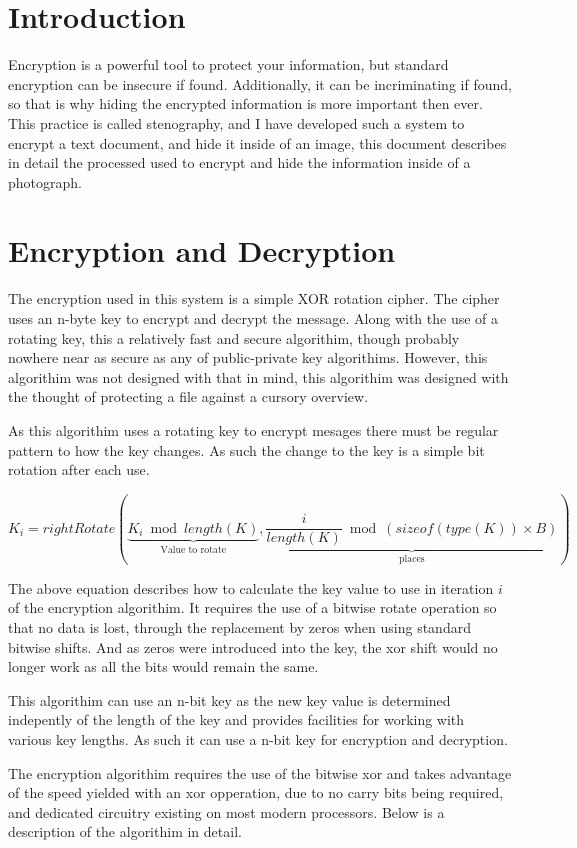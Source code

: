 \documentclass[12pt,draft]{article}
\begin{document}
\section{Introduction}
  Encryption is a powerful tool to protect your information, but standard
  encryption can be insecure if found. Additionally, it can be incriminating
  if found, so that is why hiding the encrypted information is more important
  then ever. This practice is called stenography, and I have developed such
  a system to encrypt a text document, and hide it inside of an image, this
  document describes in detail the processed used to encrypt and hide the
  information inside of a photograph.

\section{Encryption and Decryption}
  The encryption used in this system is a simple XOR rotation cipher.
  The cipher uses an n-byte key to encrypt and decrypt the message.
  Along with the use of a rotating key, this a relatively fast and
  secure algorithim, though probably nowhere near as secure as any of
  public-private key algorithims. However, this algorithim was not
  designed with that in mind, this algorithim was designed with the
  thought of protecting a file against a cursory overview.
  
  As this algorithim uses a rotating key to encrypt mesages there
  must be regular pattern to how the key changes. As such the
  change to the key is a simple bit rotation after each use. 
  
  \begin{equation}
    \label{eq:keyDerive}
    K_i = rightRotate(
        \underbrace{K_i \bmod length(K)}_\text{Value to rotate},
        \underbrace{\frac{i}{length(K)} \bmod (sizeof(type(K)) 
            \times B)}_\text{places}) 
  \end{equation}

  The above equation describes how to calculate the key value to use
  in iteration \( i \) of the encryption algorithim. It requires the use
  of a bitwise rotate operation so that no data is lost, through the
  replacement by zeros when using standard bitwise shifts. And as zeros
  were introduced into the key, the xor shift would no longer work as
  all the bits would remain the same.

  This algorithim can use an n-bit key as the new key value is
  determined indepently of the length of the key and provides
  facilities for working with various key lengths. As such it can use
  a n-bit key for encryption and decryption.

  The encryption algorithim requires the use of the bitwise xor and
  takes advantage of the speed yielded with an xor opperation, due to
  no carry bits being required, and dedicated circuitry existing on most
  modern processors. Below is a description of the algorithim in detail.

  
\end{document}

